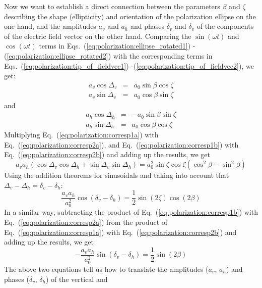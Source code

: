 Now we want to establish a direct connection between the parameters
$\beta$ and $\zeta$ describing the shape (ellipticity) and orientation
of the polarization ellipse on the one hand, and the amplitudes $a_v$
and $a_h$ and phases $\delta_v$ and $\delta_v$ of the components of
the electric field vector on the other hand.  Comparing the
$\sin(\omega t)$ and $\cos(\omega t)$ terms in
Eqs.~(\ref{eq:polarization:ellipse_rotated1})%
-(\ref{eq:polarization:ellipse_rotated2}) with the corresponding terms
in Eqs.~(\ref{eq:polarization:tip_of_fieldvec1})%
-(\ref{eq:polarization:tip_of_fieldvec2}), we get:
\begin{eqnarray}
  \label{eq:polarization:corresp1a}
 a_v \cos\Delta_v &=& a_0 \sin\beta \cos\zeta\\
  \label{eq:polarization:corresp1b}
 a_v \sin\Delta_v &=& a_0 \cos\beta \sin\zeta
\end{eqnarray}
and 
\begin{eqnarray}
  \label{eq:polarization:corresp2a}
 a_h \cos\Delta_h &=& -a_0 \sin\beta \sin\zeta\\
  \label{eq:polarization:corresp2b}
 a_h \sin\Delta_h &=&  a_0 \cos\beta \cos\zeta
\end{eqnarray}
Multiplying Eq.~(\ref{eq:polarization:corresp1a}) with
Eq.~(\ref{eq:polarization:corresp2a}), and
Eq.~(\ref{eq:polarization:corresp1b}) with
Eq.~(\ref{eq:polarization:corresp2b}) and adding up the results, we get
\begin{equation}
  a_v a_h (\cos\Delta_v\cos\Delta_h + \sin\Delta_v\sin\Delta_h)
  = a_0^2 \sin\zeta\cos\zeta (\cos^2\beta - \sin^2\beta) 
\end{equation}
Using the addition theorems for sinusoidals and taking into account
that
$\Delta_v-\Delta_h = \delta_v-\delta_h$:
\begin{equation}
  \label{eq:polarization:sinzetacosbeta}
  \frac{a_v a_h}{a_0^2} \cos(\delta_v-\delta_h)
  = \frac{1}{2}\sin(2\zeta)\cos(2\beta)
\end{equation}
In a similar way, subtracting the product of
Eq.~(\ref{eq:polarization:corresp1b}) with
Eq.~(\ref{eq:polarization:corresp2a}) from the product of
Eq.~(\ref{eq:polarization:corresp1a}) with
Eq.~(\ref{eq:polarization:corresp2b}) and adding up the results, we get
\begin{equation}
  \label{eq:polarization:sinbeta}
  -\frac{a_v a_h}{a_0^2} \sin(\delta_v-\delta_h)
  = \frac{1}{2}\sin(2\beta)
\end{equation}
The above two equations tell us how to translate the amplitudes
($a_v$, $a_h$) and phases ($\delta_v$, $\delta_h$) of the vertical and
